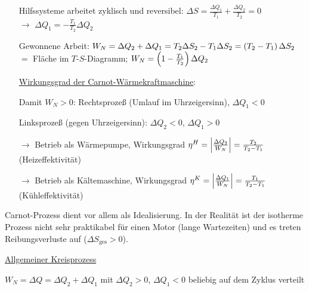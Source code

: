 \begin{figure}[H]
  \centering
  
\end{figure}
\begin{figure}[H]
  \centering
  
\end{figure}
\begin{itemize}[align=left]
\item[Hilfssysteme arbeitet zyklisch und reversibel:] $\Delta  S = \frac{\Delta Q_1}{T_1} + \frac{\Delta Q_2}{T_2} = 0$\\ $\rightarrow$ $\Delta Q_1 = - \frac{T_1}{T_2}\Delta Q_2$
\item[Gewonnene Arbeit:] $W_N = \Delta Q_2 + \Delta Q_1 = T_2 \Delta S_2 - T_1 \Delta S_2 = \left( T_2-T_1 \right)\Delta S_2$\\ $=$ Fläche im $T$-$S$-Diagramm; $W_N = \left( 1-\frac{T_1}{T_2} \right)\Delta Q_2$
\item[\uline{Wirkungsgrad der Carnot-Wärmekraftmaschine}:] 
\item[Damit $W_N > 0$:] Rechtsprozeß (Umlauf im Uhrzeigersinn), $\Delta Q_1 < 0$
\item[Linksprozeß (gegen Uhrzeigersinn):] $\Delta Q_2 <0$, $\Delta Q_1 > 0$
\item[$\rightarrow$] Betrieb als Wärmepumpe, Wirkungsgrad $\eta^H = \left| \frac{\Delta Q_2}{W_N} \right| = \frac{T_2}{T_2-T_1}$ (Heizeffektivität)
\item[$\rightarrow$] Betrieb als Kältemaschine, Wirkungsgrad $\eta^K = \left| \frac{\Delta Q_1}{W_N} \right| = \frac{T_1}{T_2-T_1}$ (Kühleffektivität)
\end{itemize}
Carnot-Prozess dient vor allem als Idealisierung. In der Realität ist der isotherme Prozess nicht sehr praktikabel für einen Motor (lange Wartezeiten) und es treten Reibungsverluste auf ($\Delta S_\text{ges} > 0$).

\uline{Allgemeiner Kreisprozess}
\begin{figure}[H]
  \centering
  
\end{figure}

$W_N= \Delta Q = \Delta Q_2 + \Delta Q_1$ mit $\Delta Q_2 > 0$, $\Delta Q_1 < 0$ beliebig auf dem Zyklus verteilt

